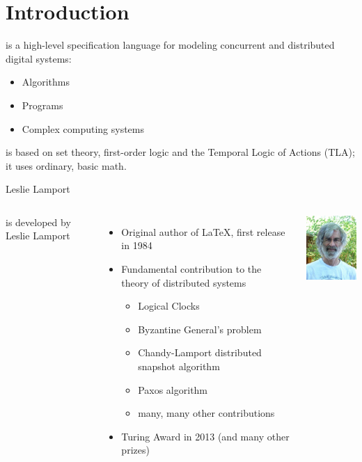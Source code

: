 \section[image=metro]{Introduction}
\begin{frame}[plain]{}
    \sectionpage
\end{frame}

\begin{frame}{\tlap}
    \tlap is a high-level specification language for modeling concurrent and distributed digital systems:
    \begin{itemize}
        \item Algorithms
        \item Programs
        \item Complex computing systems
    \end{itemize}

    \tlap is based on set theory, first-order logic and the Temporal Logic of Actions (TLA); it uses ordinary, basic math.
\end{frame}

\begin{frame}{Leslie Lamport}
    \begin{columns}[onlytextwidth,T]
        \column{\dimexpr\linewidth-30mm-5mm}
        \tlap is developed by Leslie Lamport
        \begin{itemize}
            \item Original author of \LaTeX, first release in 1984
            \item Fundamental contribution to the theory of distributed systems
            \begin{itemize}
                \item Logical Clocks
                \item Byzantine General's problem
                \item Chandy-Lamport distributed snapshot algorithm
                \item Paxos algorithm
                \item many, many other contributions
            \end{itemize}
            \item Turing Award in 2013 (and many other prizes)
        \end{itemize}

        \column{30mm}
        \includegraphics[width=3cm]{images/Leslie_Lamport.jpg}
    \end{columns}
\end{frame}

